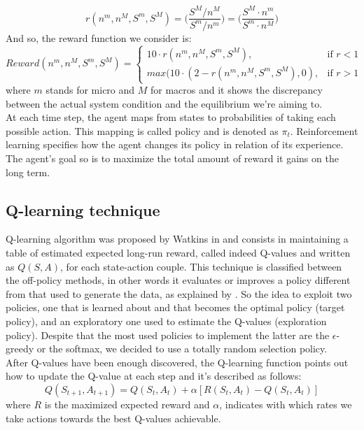 \documentclass[conference,10pt]{IEEEtran}
\begin{document}
\begin{equation*}
r(n^{m},n^{M},S^{m},S^{M})=\bigg(\frac{ S^{M} / n^{M} }{S^{m} / n^{m}} \bigg)= \bigg(\frac{ S^{M} \cdot n^{m}}{S^{m} \cdot n^{M}} \bigg)
\end{equation*}
And so, the reward function we consider is:
\begin{dmath*}
Reward(n^{m},n^{M},S^{m},S^{M}) = \begin{cases} 10 \cdot r(n^{m},n^{M},S^{m},S^{M}), & \mbox{if } r<1 \\ max( 10 \cdot(2 - r(n^{m},n^{M},S^{m},S^{M}),0), & \mbox{if } r>1 \end{cases}
\end{dmath*} 
where $m$ stands for micro and $M$ for macros and it shows the discrepancy between the actual system condition and the equilibrium we're aiming to. \\
At each time step, the agent maps from states to probabilities of taking each possible action. This mapping is called policy and is denoted as $\pi_t$. Reinforcement
learning specifies how the agent changes its policy in relation of its experience. The agent’s goal so is to maximize the total amount of reward it gains on the long term.
\subsection{Q-learning technique}
Q-learning algorithm was proposed by Watkins in \cite{watkins1992q} and consists in maintaining a table of estimated expected long-run reward, called indeed Q-values and written as $Q(S,A)$, for each state-action couple. This technique is classified between the off-policy methods, in other words it evaluates or improves a policy different from that used to generate the data, as explained by \cite{sutton1998reinforcement}. So the idea to exploit two policies, one that is learned about and that becomes the optimal policy (target policy), and an exploratory one used to estimate the Q-values (exploration policy). Despite that the most used policies to implement the latter are the $\epsilon$-greedy or the softmax, we decided to use a totally random selection policy. \\
After Q-values have been enough discovered, the Q-learning function points out how to update the Q-value at each step and it's described as follows:
\begin{equation*}
Q(S_{t+1},A_{t+1})=Q(S_{t},A_{t})+\alpha[R(S_{t},A_{t})-Q(S_{t},A_{t})]
\end{equation*}
where $ R  $ is the maximized expected reward and $\alpha$, indicates with which rates we take actions towards the best Q-values achievable.
\end{document}
